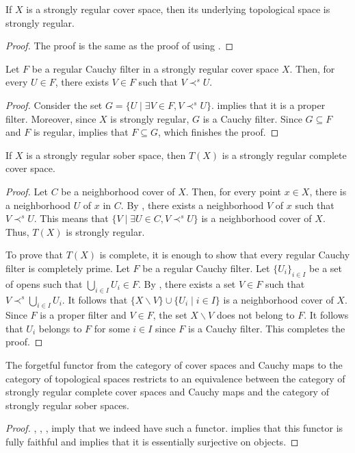 \documentclass[reqno]{amsart}
\theoremstyle{definition}
\theoremstyle{remark}
\numberwithin{figure}{section}
\newcommand{\rb}{\prec}
\begin{document}
\begin{prop}
If $X$ is a strongly regular cover space, then its underlying topological space is strongly regular.
\end{prop}
\begin{proof}
The proof is the same as the proof of  using .
\end{proof}

\begin{lem}
Let $F$ be a regular Cauchy filter in a strongly regular cover space $X$.
Then, for every $U \in F$, there exists $V \in F$ such that $V \rb^s U$.
\end{lem}
\begin{proof}
Consider the set $G = \{ U \mid \exists V \in F, V \rb^s U \}$.
 implies that it is a proper filter.
Moreover, since $X$ is strongly regular, $G$ is a Cauchy filter.
Since $G \subseteq F$ and $F$ is regular,  implies that $F \subseteq G$, which finishes the proof.
\end{proof}

\begin{prop}[u-surjective]
If $X$ is a strongly regular sober space, then $T(X)$ is a strongly regular complete cover space.
\end{prop}
\begin{proof}
Let $C$ be a neighborhood cover of $X$.
Then, for every point $x \in X$, there is a neighborhood $U$ of $x$ in $C$.
By , there exists a neighborhood $V$ of $x$ such that $V \rb^s U$.
This means that $\{ V \mid \exists U \in C, V \rb^s U\}$ is a neighborhood cover of $X$.
Thus, $T(X)$ is strongly regular.

To prove that $T(X)$ is complete, it is enough to show that every regular Cauchy filter is completely prime.
Let $F$ be a regular Cauchy filter.
Let $\{ U_i \}_{i \in I}$ be a set of opens such that $\bigcup_{i \in I} U_i \in F$.
By , there exists a set $V \in F$ such that $V \rb^s \bigcup_{i \in I} U_i$.
It follows that $\{ X \backslash V \} \cup \{ U_i \mid i \in I \}$ is a neighborhood cover of $X$.
Since $F$ is a proper filter and $V \in F$, the set $X \backslash V$ does not belong to $F$.
It follows that $U_i$ belongs to $F$ for some $i \in I$ since $F$ is a Cauchy filter.
This completes the proof.
\end{proof}

\begin{thm}
The forgetful functor from the category of cover spaces and Cauchy maps to the category of topological spaces restricts to an equivalence between the category of strongly regular complete cover spaces and Cauchy maps and the category of strongly regular sober spaces.
\end{thm}
\begin{proof}
, , ,  imply that we indeed have such a functor.
 implies that this functor is fully faithful and  implies that it is essentially surjective on objects.
\end{proof}
\end{document}
